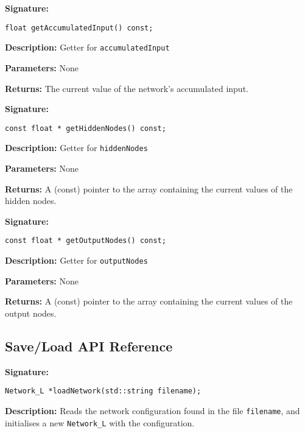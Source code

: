 \documentclass[a4paper]{article}
\begin{document}
\textbf{Signature:} \begin{lstlisting}
float getAccumulatedInput() const;
\end{lstlisting}

\textbf{Description: }
Getter for \lstinline{accumulatedInput}

\textbf{Parameters: } None

\textbf{Returns: }
The current value of the network's accumulated input.

\hrulefill %

\textbf{Signature:} \begin{lstlisting}
const float * getHiddenNodes() const;
\end{lstlisting}

\textbf{Description: }
Getter for \lstinline{hiddenNodes}

\textbf{Parameters: } None

\textbf{Returns: }
A (const) pointer to the array containing the current values of the hidden nodes.

\hrulefill %

\textbf{Signature:} \begin{lstlisting}
const float * getOutputNodes() const;
\end{lstlisting}

\textbf{Description: }
Getter for \lstinline{outputNodes}

\textbf{Parameters: } None

\textbf{Returns: }
A (const) pointer to the array containing the current values of the output nodes.

\hrulefill %

\subsection{Save/Load API Reference}%
\label{subsec:dn_API_networksl}

\hrulefill %

\textbf{Signature:} \begin{lstlisting}
Network_L *loadNetwork(std::string filename);
\end{lstlisting}

\textbf{Description: }
Reads the network configuration found in the file \lstinline{filename}, and initialises a new \lstinline{Network_L} with the configuration.
\end{document}
